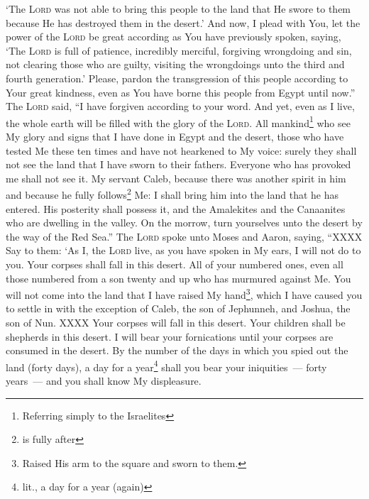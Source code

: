 \begin{enumerate*}[mode=unboxed]
     `The \textsc{Lord} was not able to bring this people to the land that He swore to them because He has destroyed them in the desert.'%
     And now, I plead with You, let the power of the \textsc{Lord} be great according as You have previously spoken, saying,%
     `The \textsc{Lord} is full of patience, incredibly merciful, forgiving wrongdoing and sin, not clearing those who are guilty, visiting the wrongdoings unto the third and fourth generation.'%
     Please, pardon the transgression of this people according to Your great kindness, even as You have borne this people from Egypt until now.''%
     The \textsc{Lord} said, ``I have forgiven according to your word.%
     And yet, even as I live, the whole earth will be filled with the glory of the \textsc{Lord}.%
     All mankind\footnote{Referring simply to the Israelites} who see My glory and signs that I have done in Egypt and the desert, those who have tested Me these ten times and have not hearkened to My voice:%
     surely they shall not see the land that I have sworn to their fathers. Everyone who has provoked me shall not see it.%
     My servant Caleb, because there was another spirit in him and because he fully follows\footnote{is fully after} Me: I shall bring him into the land that he has entered. His posterity shall possess it,%
     and the Amalekites and the Canaanites who are dwelling in the valley. On the morrow, turn yourselves unto the desert by the way of the Red Sea.''%
     The \textsc{Lord} spoke unto Moses and Aaron, saying,%
     ``XXXX%
     Say to them: `As I, the \textsc{Lord} live, as you have spoken in My ears, I will not do to you.%
     Your corpses shall fall in this desert. All of your numbered ones, even all those numbered from a son twenty and up who has murmured against Me.%
     You will not come into the land that I have raised My hand\footnote{Raised His arm to the square and sworn to them.}, which I have caused you to settle in with the exception of Caleb, the son of Jephunneh, and Joshua, the son of Nun.%
     XXXX%
     Your corpses will fall in this desert.%
     Your children shall be shepherds in this desert. I will bear your fornications until your corpses are consumed in the desert.%
     By the number of the days in which you spied out the land (forty days), a day for a year\footnote{lit., a day for a year (again)} shall you bear your iniquities~--- forty years~--- and you shall know My displeasure.%

\end{enumerate*}
